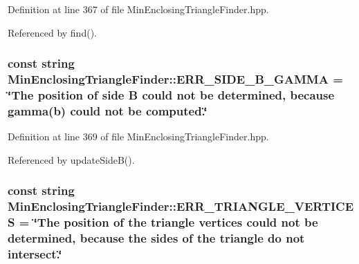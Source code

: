 \-Definition at line 367 of file \-Min\-Enclosing\-Triangle\-Finder.\-hpp.



\-Referenced by find().

\hypertarget{classmultiscale_1_1MinEnclosingTriangleFinder_a84e5ff8e5fec501f3d3b9ac6ee2416ee}{
\subsubsection[{\-E\-R\-R\-\_\-\-S\-I\-D\-E\-\_\-\-B\-\_\-\-G\-A\-M\-M\-A}]{\setlength{\rightskip}{0pt plus 5cm}const string {\bf \-Min\-Enclosing\-Triangle\-Finder\-::\-E\-R\-R\-\_\-\-S\-I\-D\-E\-\_\-\-B\-\_\-\-G\-A\-M\-M\-A} = \char`\"{}\-The position of side \-B could not be determined, because {\bf gamma}({\bf b}) could not be computed.\char`\"{}}}\label{classmultiscale_1_1MinEnclosingTriangleFinder_a84e5ff8e5fec501f3d3b9ac6ee2416ee}


\-Definition at line 369 of file \-Min\-Enclosing\-Triangle\-Finder.\-hpp.



\-Referenced by update\-Side\-B().

\hypertarget{classmultiscale_1_1MinEnclosingTriangleFinder_aefe21c593b616438f9fa3591625322aa}{
\subsubsection[{\-E\-R\-R\-\_\-\-T\-R\-I\-A\-N\-G\-L\-E\-\_\-\-V\-E\-R\-T\-I\-C\-E\-S}]{\setlength{\rightskip}{0pt plus 5cm}const string {\bf \-Min\-Enclosing\-Triangle\-Finder\-::\-E\-R\-R\-\_\-\-T\-R\-I\-A\-N\-G\-L\-E\-\_\-\-V\-E\-R\-T\-I\-C\-E\-S} = \char`\"{}\-The position of the triangle vertices could not be determined, because the sides of the triangle do not intersect.\char`\"{}}}\label{classmultiscale_1_1MinEnclosingTriangleFinder_aefe21c593b616438f9fa3591625322aa}


